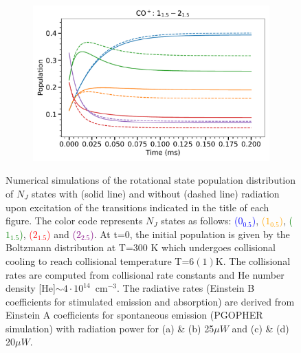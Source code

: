 \begin{figure}[!htb]
\begin{subfigure}[b]{0.49\textwidth}
        \caption{}
    \end{subfigure}
    \hfill
    \begin{subfigure}[b]{0.49\textwidth}
        \centering
        \includegraphics[width=1\textwidth]{chapters/CO+_ROSAA_paper/SI/CO^+_pop_ratio_1_1.5 - 2_1.5.pdf}
        \caption{}
    \end{subfigure}
    \caption{Numerical simulations of the rotational state population distribution of $N_J$ states with (solid line) and without (dashed line) radiation upon excitation of the transitions indicated in the title of each figure. The color code represents $N_J$ states as follows: \textcolor{blue}{\co($0_{0.5}$)}, \textcolor{orange}{\co($1_{0.5}$)}, \textcolor{green}{\co($1_{1.5}$)}, \textcolor{red}{\co($2_{1.5}$)} and  \textcolor{purple}{\co($2_{2.5}$)}. At t=0, the initial population is given by the  Boltzmann distribution at T=300 K which undergoes collisional cooling to reach collisional temperature T=$6(1)$K. The collisional rates are computed from collisional rate constants and He number density [He]$\sim 4\cdot10^{14}$~cm$^{-3}$. The radiative rates (Einstein B  coefficients for stimulated emission and absorption) are derived from Einstein A coefficients for spontaneous emission (PGOPHER simulation) with radiation power for (a) \& (b) 25$\mu W$ and (c) \& (d) 20$\mu W$.}
\end{figure}

